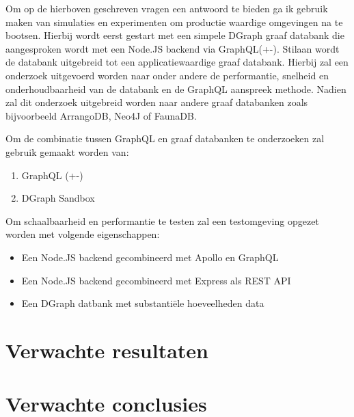 Om op de hierboven geschreven vragen een antwoord te bieden ga ik gebruik maken van simulaties en experimenten om productie waardige omgevingen na te bootsen. Hierbij wordt eerst gestart met een simpele DGraph graaf databank die aangesproken wordt met een Node.JS backend via GraphQL(+-). Stilaan wordt de databank uitgebreid tot een applicatiewaardige graaf databank. Hierbij  zal een onderzoek uitgevoerd worden naar onder andere de performantie, snelheid en onderhoudbaarheid van de databank en de GraphQL aanspreek methode. Nadien zal dit onderzoek uitgebreid worden naar andere graaf databanken zoals bijvoorbeeld ArrangoDB, Neo4J of FaunaDB.

Om de combinatie tussen GraphQL en graaf databanken te onderzoeken zal gebruik gemaakt worden van: 
\begin{enumerate}
	\item GraphQL (+-)
	\item DGraph Sandbox
\end{enumerate}

Om schaalbaarheid en performantie te testen zal een testomgeving opgezet worden met volgende eigenschappen:
\begin{itemize}
	\item Een Node.JS backend gecombineerd met Apollo en GraphQL
	\item Een Node.JS backend gecombineerd met Express als REST API
	\item Een DGraph datbank met substantiële hoeveelheden data
\end{itemize}

\section{Verwachte resultaten}
\label{sec:verwachte_resultaten}


\section{Verwachte conclusies}
\label{sec:verwachte_conclusies}

